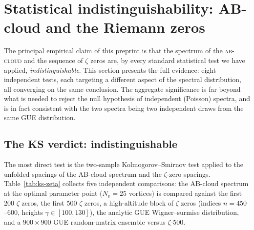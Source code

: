 \documentclass[11pt,a4paper]{article}
\theoremstyle{plain}
\theoremstyle{definition}
\theoremstyle{remark}
\newcommand{\Abcloud}{\textsc{ab-cloud}}
\begin{document}
\section{Statistical indistinguishability: AB-cloud and the Riemann zeros}\label{sec:indist}

The principal empirical claim of this preprint is that the spectrum of the \Abcloud{} and the sequence of $\zeta$ zeros are, by every standard statistical test we have applied, \emph{indistinguishable}. This section presents the full evidence: eight independent tests, each targeting a different aspect of the spectral distribution, all converging on the same conclusion. The aggregate significance is far beyond what is needed to reject the null hypothesis of independent (Poisson) spectra, and is in fact consistent with the two spectra being two independent draws from the same GUE distribution.

\subsection{The KS verdict: indistinguishable}

The most direct test is the two-sample Kolmogorov--Smirnov test applied to the unfolded spacings of the AB-cloud spectrum and the $\zeta$-zero spacings. Table~\ref{tab:ks-zeta} collects five independent comparisons: the AB-cloud spectrum at the optimal parameter point ($N_v = 25$ vortices) is compared against the first 200 $\zeta$ zeros, the first 500 $\zeta$ zeros, a high-altitude block of $\zeta$ zeros (indices $n = 450$--$600$, heights $\gamma\in[100, 130]$), the analytic GUE Wigner--surmise distribution, and a $900\times 900$ GUE random-matrix ensemble versus $\zeta$-500.
\end{document}
